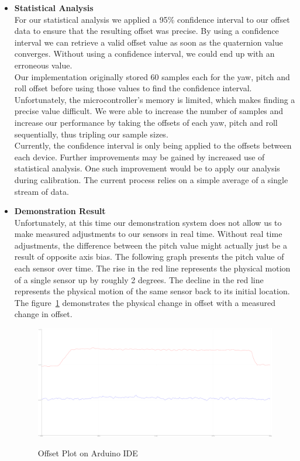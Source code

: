 \begin{itemize}
\item \textbf{Statistical Analysis}
\\For our statistical analysis we applied a 95\% confidence interval to our offset data to ensure that the resulting offset was precise. By using a confidence interval we can retrieve a valid offset value as soon as the quaternion value converges. Without using a confidence interval, we could end up with an erroneous value.\\

Our implementation originally stored 60 samples each for the yaw, pitch and roll offset before using those values to find the confidence interval. Unfortunately, the microcontroller's memory is limited, which makes finding a precise value difficult. We were able to increase the number of samples and increase our performance by taking the offsets of each yaw, pitch and roll sequentially, thus tripling our sample sizes.\\

Currently, the confidence interval is only being applied to the offsets between each device. Further improvements may be gained by increased use of statistical analysis. One such improvement would be to apply our analysis during calibration. The current process relies on a simple average of a single stream of data.\\

\item \textbf{Demonstration Result}
\\Unfortunately, at this time our demonstration system does not allow us to make measured adjustments to our sensors in real time. Without real time adjustments, the difference between the pitch value might actually just be a result of opposite axis bias. The following graph presents the pitch value of each sensor over time. The rise in the red line represents the physical motion of a single sensor up by roughly 2 degrees. The decline in the red line represents the physical motion of the same sensor back to its initial location. The figure~\ref{fig:plot} demonstrates the physical change in offset with a measured change in offset.

	\begin{figure}
		\centering
	 		\caption{Offset Plot on Arduino IDE}
	      	\includegraphics[width=\textwidth,height=\textheight,keepaspectratio]{plot}
	    \label{fig:plot}
	\end{figure}

\end{itemize}

